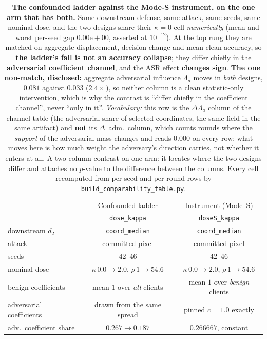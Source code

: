 \documentclass{article}
\begin{document}
\begin{table}[h]
\centering\small
\caption{\textbf{The confounded ladder against the Mode-S instrument, on the one arm that has both.} Same downstream defense, same attack, same seeds, same nominal dose, and the two designs share their $\kappa{=}0$ cell \emph{numerically} (mean and worst per-seed gap $0.00\mathrm{e}{+}00$, asserted at $10^{-12}$). At the top rung they are matched on aggregate displacement, decision change and mean clean accuracy, so \textbf{the ladder's fall is not an accuracy collapse}; they differ chiefly in the \textbf{adversarial coefficient channel}, and the ASR effect \textbf{changes sign}. \textbf{The one non-match, disclosed:} aggregate adversarial influence $\Lambda_a$ moves in \emph{both} designs, $0.081$ against $0.033$ ($2.4\times$), so neither column is a clean statistic-only intervention, which is why the contrast is ``differ chiefly in the coefficient channel'', never ``only in it''. \emph{Vocabulary:} this row is the $\Delta\Lambda_a$ column of the channel table (the adversarial share of selected coordinates, the same field in the same artifact) and \textbf{not} its $\Delta$~adm.\ column, which counts rounds where the \emph{support} of the adversarial mass changes and reads $0.000$ on every row: what moves here is how much weight the adversary's direction carries, not whether it enters at all. A two-column contrast on one arm: it locates where the two designs differ and attaches no $p$-value to the difference between the columns. Every cell recomputed from per-seed and per-round rows by \texttt{build\_comparability\_table.py}.}
\label{tab:comparability}
\begin{tabular}{lcc}
\toprule
& Confounded ladder & Instrument (Mode~S) \\
& \texttt{dose\_kappa} & \texttt{doseS\_kappa} \\
\midrule
downstream $d_2$ & \texttt{coord\_median} & \texttt{coord\_median} \\
attack & committed pixel & committed pixel \\
seeds & 42--46 & 42--46 \\
nominal dose & $\kappa\,0.0\!\to\!2.0$, $\rho\,1\!\to\!54.6$ & $\kappa\,0.0\!\to\!2.0$, $\rho\,1\!\to\!54.6$ \\
\midrule
benign coefficients & mean $1$ over \emph{all} clients & mean $1$ over \emph{benign} clients \\
adversarial coefficients & drawn from the same spread & pinned $c=1.0$ exactly \\
adv.\ coefficient share & $0.267 \to \mathbf{0.187}$ & $0.266667$, constant \\

\end{tabular}
\end{table}
\end{document}
